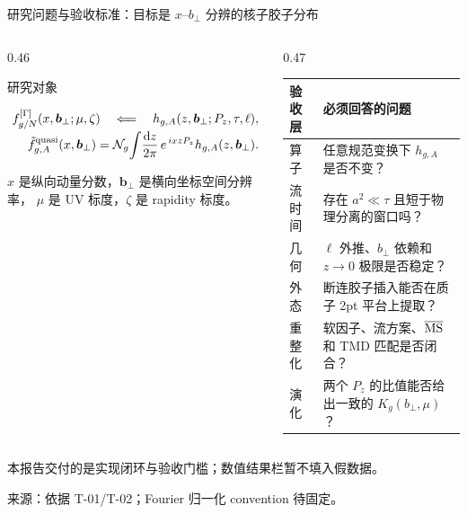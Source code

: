 \documentclass[UTF8,aspectratio=169,11pt]{ctexbeamer}
\newcommand{\source}[1]{%
  \par\vspace{0.05em}%
  {\raggedright\scriptsize\color{muted}来源：#1\par}}
\newcommand{\dd}{\mathrm{d}}
\begin{document}
\begin{frame}[t]{研究问题与验收标准：目标是 $x$--$b_\perp$ 分辨的核子胶子分布}
  \begin{columns}[T,totalwidth=\textwidth]
    \begin{column}{0.46\textwidth}
      \begin{block}{研究对象}
        {\small
        \begin{align*}
          f_{g/N}^{[\Gamma]}(x,\boldsymbol b_\perp;\mu,\zeta)
          \quad\Longleftarrow\quad
          h_{g,A}(z,\boldsymbol b_\perp;P_z,\tau,\ell),\\[-0.2em]
          \tilde f_{g,A}^{\rm quasi}(x,\boldsymbol b_\perp)
          =\mathcal{N}_g\!\int\!\frac{\dd z}{2\pi}\,
          e^{\,i x zP_z}h_{g,A}(z,\boldsymbol b_\perp).
        \end{align*}\par}
        $x$ 是纵向动量分数，$\boldsymbol b_\perp$ 是横向坐标空间分辨率，
        $\mu$ 是 UV 标度，$\zeta$ 是 rapidity 标度。
      \end{block}
    \end{column}
    \begin{column}{0.47\textwidth}
      \begin{tabularx}{\linewidth}{@{}lX@{}}
        \toprule
        验收层 & 必须回答的问题 \\
        \midrule
        算子 & 任意规范变换下 $h_{g,A}$ 是否不变？\\
        流时间 & 存在 $a^2\ll\tau$ 且短于物理分离的窗口吗？\\
        几何 & $\ell$ 外推、$b_\perp$ 依赖和 $z\to0$ 极限是否稳定？\\
        外态 & 断连胶子插入能否在质子 2pt 平台上提取？\\
        重整化 & 软因子、流方案、$\overline{\rm MS}$ 和 TMD 匹配是否闭合？\\
        演化 & 两个 $P_z$ 的比值能否给出一致的 $K_g(b_\perp,\mu)$？\\
        \bottomrule
      \end{tabularx}
    \end{column}
  \end{columns}
  {\centering
    \textcolor{warning}{本报告交付的是实现闭环与验收门槛；数值结果栏暂不填入假数据。}\par}
  \source{依据 T-01/T-02；Fourier 归一化 convention 待固定。}
\end{frame}
\end{document}
